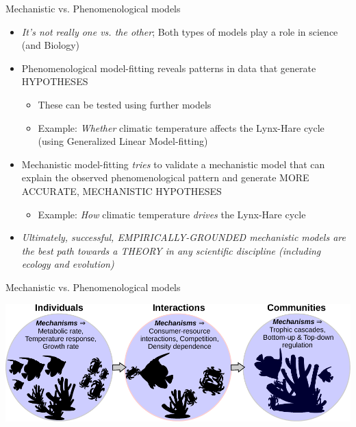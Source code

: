 \documentclass[xcolor={usenames,x11names},compress]{beamer}
\renewcommand{\(}{\begin{columns}}
\renewcommand{\)}{\end{columns}}
\newcommand{\<}[1]{\begin{column}{#1}}
\renewcommand{\>}{\end{column}}
\begin{document}
\begin{frame}{Mechanistic vs. Phenomenological models}

	\begin{itemize}[<+->]\itemsep10pt
		\item {\it It's not really one vs. the other}; Both types of models play a role in science (and Biology)
		\item Phenomenological model-fitting reveals patterns in data that generate HYPOTHESES 
 		\begin{itemize}
			\item These can be tested using further models
			\item Example: {\it Whether} climatic temperature affects the Lynx-Hare cycle (using Generalized Linear Model-fitting)
		\end{itemize} 

		\item Mechanistic model-fitting {\it tries} to validate a mechanistic model that can explain the observed phenomenological pattern and generate MORE ACCURATE, MECHANISTIC HYPOTHESES
		\begin{itemize}
			\item Example: {\it How} climatic temperature {\it drives} the Lynx-Hare cycle
		\end{itemize} 
		\item \it Ultimately, successful, EMPIRICALLY-GROUNDED mechanistic models are the best path towards a THEORY in any scientific discipline (including ecology and evolution)  
	  \end{itemize}
 
 
 \end{frame}

\begin{frame}{Mechanistic vs. Phenomenological models}
	 
  \begin{center}
	  \includegraphics[width=\textwidth]{Mechanisms.pdf}
  \end{center} 
 
 \end{frame}
\end{document}
